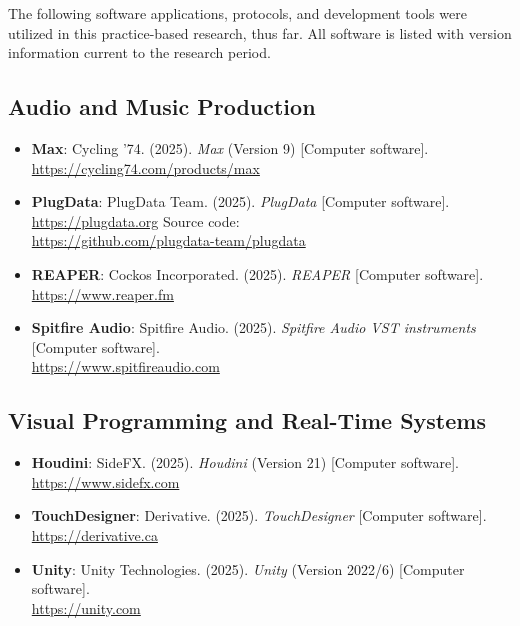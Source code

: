 The following software applications, protocols, and development tools were utilized in this practice-based research, thus far. All software is listed with version information current to the research period.
\label{pre:software}

\subsection*{Audio and Music Production}

\begin{itemize}[nosep]
	\item \textbf{Max}: 
	Cycling '74. (2025). \textit{Max} (Version 9) [Computer software]. 
	\\ \url{https://cycling74.com/products/max}
	
	\item \textbf{PlugData}: 
	PlugData Team. (2025). \textit{PlugData} [Computer software]. \\ \url{https://plugdata.org} Source code: \\ \url{https://github.com/plugdata-team/plugdata}
	
	\item \textbf{REAPER}: 
	Cockos Incorporated. (2025). \textit{REAPER} [Computer software]. 
	\\ \url{https://www.reaper.fm}
	
	\item \textbf{Spitfire Audio}:  
	Spitfire Audio. (2025). \textit{Spitfire Audio VST instruments} [Computer software]. 
	\\ \url{https://www.spitfireaudio.com}
\end{itemize}

\subsection*{Visual Programming and Real-Time Systems}

\begin{itemize}[nosep]
	\item \textbf{Houdini}:  
	SideFX. (2025). \textit{Houdini} (Version 21) [Computer software]. 
	\\ \url{https://www.sidefx.com}
	
	\item \textbf{TouchDesigner}:  
	Derivative. (2025). \textit{TouchDesigner} [Computer software]. 
	\\ \url{https://derivative.ca}
	
	\item \textbf{Unity}:  
	Unity Technologies. (2025). \textit{Unity} (Version 2022/6) [Computer software]. 
	\\ \url{https://unity.com}
\end{itemize}

